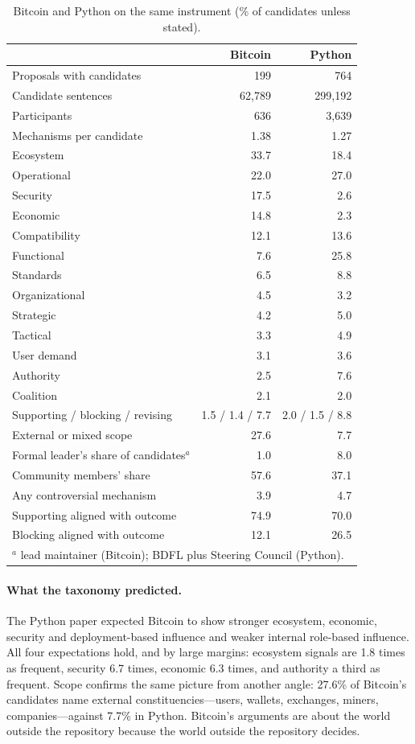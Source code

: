 \documentclass[sigconf,screen]{acmart}
\begin{document}
\begin{table}[t]
\caption{Bitcoin and Python on the same instrument (\% of candidates unless stated).}
\label{tab:compare}
\small
\setlength{\tabcolsep}{4pt}
\begin{tabular}{lrr}
\toprule
 & Bitcoin & Python \\
\midrule
Proposals with candidates & 199 & 764 \\
Candidate sentences & 62,789 & 299,192 \\
Participants & 636 & 3,639 \\
Mechanisms per candidate & 1.38 & 1.27 \\
\midrule
Ecosystem & 33.7 & 18.4 \\
Operational & 22.0 & 27.0 \\
Security & 17.5 & 2.6 \\
Economic & 14.8 & 2.3 \\
Compatibility & 12.1 & 13.6 \\
Functional & 7.6 & 25.8 \\
Standards & 6.5 & 8.8 \\
Organizational & 4.5 & 3.2 \\
Strategic & 4.2 & 5.0 \\
Tactical & 3.3 & 4.9 \\
User demand & 3.1 & 3.6 \\
Authority & 2.5 & 7.6 \\
Coalition & 2.1 & 2.0 \\
\midrule
Supporting / blocking / revising & 1.5 / 1.4 / 7.7 & 2.0 / 1.5 / 8.8 \\
External or mixed scope & 27.6 & 7.7 \\
Formal leader's share of candidates$^a$ & 1.0 & 8.0 \\
Community members' share & 57.6 & 37.1 \\
Any controversial mechanism & 3.9 & 4.7 \\
Supporting aligned with outcome & 74.9 & 70.0 \\
Blocking aligned with outcome & 12.1 & 26.5 \\
\bottomrule
\multicolumn{3}{l}{\footnotesize $^a$ lead maintainer (Bitcoin); BDFL plus Steering Council (Python).}
\end{tabular}
\end{table}

\paragraph{What the taxonomy predicted.} The Python paper expected Bitcoin to show stronger ecosystem, economic, security and deployment-based influence and weaker internal role-based influence. All four expectations hold, and by large margins: ecosystem signals are 1.8 times as frequent, security 6.7 times, economic 6.3 times, and authority a third as frequent. Scope confirms the same picture from another angle: 27.6\% of Bitcoin's candidates name external constituencies---users, wallets, exchanges, miners, companies---against 7.7\% in Python. Bitcoin's arguments are about the world outside the repository because the world outside the repository decides.
\end{document}
